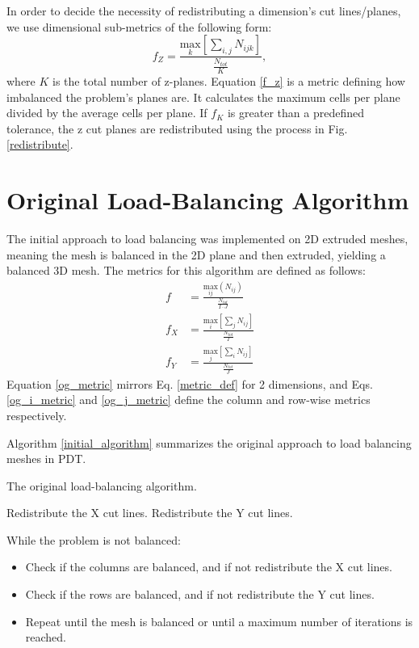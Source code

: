 In order to decide the necessity of redistributing a dimension's cut lines/planes, we use dimensional sub-metrics of the following form:
\begin{equation}
f_{Z} = \frac{\underset{k}{\text{max}}[\sum_{i,j} N_{ijk}]}{\frac{N_{tot}}{K}},
\label{f_z}
\end{equation}
where $K$ is the total number of z-planes.
Equation \ref{f_z} is a metric defining how imbalanced the problem's planes are. It calculates the maximum cells per plane divided by the average cells per plane. If $f_K$ is greater than a predefined tolerance, the z cut planes are redistributed using the process in Fig. \ref{redistribute}.

\section{Original Load-Balancing Algorithm}
\label{sec:og_lb}

The initial approach to load balancing was implemented on 2D extruded meshes, meaning the mesh is balanced in the 2D plane and then extruded, yielding a balanced 3D mesh. The metrics for this algorithm are defined as follows:
\begin{align}
f &= \frac{\underset{ij}{\text{max}}(N_{ij})}{\frac{N_{tot}}{I\cdot J}}  \label{og_metric}\\
f_X &= \frac{\underset{i}{\text{max}}[\sum_{j} N_{ij}] } {\frac{N_{tot}}{I}} \label{og_i_metric} \\
f_Y &= \frac{\underset{j}{\text{max}}[\sum_{i} N_{ij}] } {\frac{N_{tot}}{J}} \label{og_j_metric}
\end{align}
Equation \ref{og_metric} mirrors Eq. \ref{metric_def} for 2 dimensions, and Eqs. \ref{og_i_metric} and \ref{og_j_metric} define the column and row-wise metrics respectively.

 Algorithm \ref{initial_algorithm} summarizes the original approach to load balancing meshes in PDT.
\begin{algorithm}[H]
\caption{The original load-balancing algorithm.}
\label{initial_algorithm}
\begin{algorithmic}

    \STATE Redistribute the X cut lines.
  \ENDIF
  	\STATE Redistribute the Y cut lines.
  \ENDIF
\ENDWHILE
\end{algorithmic}
\end{algorithm}
While the problem is not balanced:
\begin{itemize}
  \item Check if the columns are balanced, and if not redistribute the X cut lines.
  \item Check if the rows are balanced, and if not redistribute the Y cut lines.
  \item Repeat until the mesh is balanced or until a maximum number of iterations is reached.
\end{itemize}

